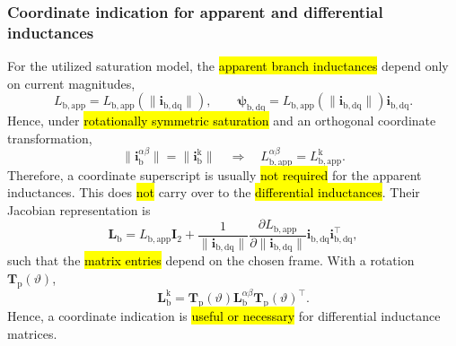 \begin{frame}
    \frametitle{Coordinate indication for apparent and differential inductances}
    For the utilized saturation model, the \hl{apparent branch inductances} depend only on current magnitudes,
    \begin{equation*}
        L_{\mathrm{b},\mathrm{app}}=L_{\mathrm{b},\mathrm{app}}(\|\bm{i}_{\mathrm{b},\mathrm{dq}}\|),
        \qquad
        \bm{\psi}_{\mathrm{b},\mathrm{dq}}=L_{\mathrm{b},\mathrm{app}}(\|\bm{i}_{\mathrm{b},\mathrm{dq}}\|)\bm{i}_{\mathrm{b},\mathrm{dq}}.
    \end{equation*}
    Hence, under \hl{rotationally symmetric saturation} and an orthogonal coordinate transformation,
    \begin{equation*}
        \|\bm{i}^{\alpha\beta}_{\mathrm{b}}\|=\|\bm{i}^{\mathrm{k}}_{\mathrm{b}}\|
        \quad\Rightarrow\quad
        L^{\alpha\beta}_{\mathrm{b},\mathrm{app}}=L^{\mathrm{k}}_{\mathrm{b},\mathrm{app}}.
    \end{equation*}
    Therefore, a coordinate superscript is usually \hl{not required} for the apparent inductances.
    \vspace{0.4em}
    This does \hl{not} carry over to the \hl{differential inductances}. Their Jacobian representation is
    \begin{equation*}
        \bm{L}_{\mathrm{b}}=L_{\mathrm{b},\mathrm{app}}\bm{I}_2+
        \frac{1}{\|\bm{i}_{\mathrm{b},\mathrm{dq}}\|}
        \frac{\partial L_{\mathrm{b},\mathrm{app}}}{\partial \|\bm{i}_{\mathrm{b},\mathrm{dq}}\|}
        \bm{i}_{\mathrm{b},\mathrm{dq}}\bm{i}_{\mathrm{b},\mathrm{dq}}^{\top},
    \end{equation*}
    such that the \hl{matrix entries} depend on the chosen frame.
    With a rotation $\bm{T}_{\mathrm{p}}(\vartheta)$,
    \begin{equation*}
        \bm{L}^{\mathrm{k}}_{\mathrm{b}}=\bm{T}_{\mathrm{p}}(\vartheta)\bm{L}^{\alpha\beta}_{\mathrm{b}}\bm{T}_{\mathrm{p}}(\vartheta)^{\top}.
    \end{equation*}
    Hence, a coordinate indication is \hl{useful or necessary} for differential inductance matrices.
\end{frame}


